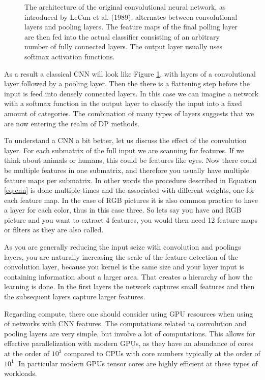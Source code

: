 \documentclass[12pt,a4paper]{article} %
\numberwithin{equation}{section}
\begin{document}
\begin{figure}[t!]
			\caption{The architecture of the original convolutional neural network, as introduced by LeCun et al. (1989), alternates between convolutional layers and pooling layers. The feature maps of the final polling layer are then fed into the actual classifier consisting of an arbitrary number of fully connected layers. The output layer usually uses softmax activation functions.}
			\label{fig:cnn}
		\end{figure}
	
		As a result a classical CNN will look like Figure \ref{fig:cnn}, with layers of a convolutional layer followed by a pooling layer. Then the there is a flattening step before the input is feed into densely connected layers. In this case we can imagine a network with a softmax function in the output layer to classify the input into a fixed amount of categories. The combination of many types of layers suggests that we are now entering the realm of DP methods.
		
		To understand a CNN a bit better, let us discuss the effect of the convolution layer. For each submatrix of the full input we are scanning for features. If we think about animals or humans, this could be features like eyes. Now there could be multiple features in one submatrix, and therefore you usually have multiple feature maps per submatrix. In other words the procedure described in Equation \ref{eq:cnn} is done multiple times and the associated with different weights, one for each feature map. In the case of RGB pictures it is also common practice to have a layer for each color, thus in this case three. So lets say you have and RGB picture and you want to extract 4 features, you would then need 12 feature maps or filters as they are also called.
		
		As you are generally reducing the input seize with convolution and poolings layers, you are naturally increasing the scale of the feature detection of the convolution layer, because you kernel is the same size and your layer input is containing information about a larger area. That creates a hierarchy of how the learning is done. In the first layers the network captures small features and then the subsequent layers capture larger features.
		
		Regarding compute, there one should consider using GPU resources when using of networks with CNN features. The computations related to convolution and pooling layers are very simple, but involve a lot of computations. This allows for effective parallelization with modern GPUs, as they have an abundance of cores at the order of $10^3$ compared to CPUs with core numbers typically at the order of $10^1$. In particular modern GPUs tensor cores are highly efficient at these types of workloads. 
		
\end{document}
